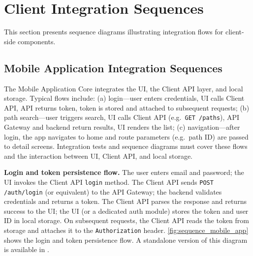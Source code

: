 \section{Client Integration Sequences}
\label{sec:client_integration_sequences}%

This section presents sequence diagrams illustrating integration flows for client-side components.

\subsection{Mobile Application Integration Sequences}
\label{subsec:mobile_application_sequences}%

The Mobile Application Core integrates the UI, the Client API layer, and local storage. Typical flows include: (a) login---user enters credentials, UI calls Client API, API returns token, token is stored and attached to subsequent requests; (b) path search---user triggers search, UI calls Client API (e.g.\ \texttt{GET /paths}), API Gateway and backend return results, UI renders the list; (c) navigation---after login, the app navigates to home and route parameters (e.g.\ path ID) are passed to detail screens. Integration tests and sequence diagrams must cover these flows and the interaction between UI, Client API, and local storage.

\textbf{Login and token persistence flow.} The user enters email and password; the UI invokes the Client API \texttt{login} method. The Client API sends \texttt{POST /auth/login} (or equivalent) to the API Gateway; the backend validates credentials and returns a token. The Client API parses the response and returns success to the UI; the UI (or a dedicated auth module) stores the token and user ID in local storage. On subsequent requests, the Client API reads the token from storage and attaches it to the \texttt{Authorization} header. \cref{fig:sequence_mobile_app} shows the login and token persistence flow. A standalone version of this diagram is available in .

